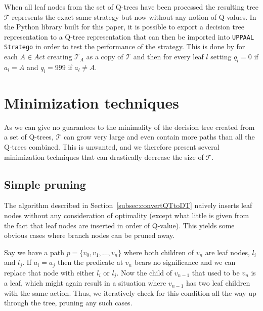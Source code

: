 When all leaf nodes from the set of Q-trees have been processed the resulting
tree $\mathcal{T}$ represents the exact same strategy but now without any notion
of Q-values. In the Python library built for this paper, it is possible to
export a decision tree representation to a Q-tree representation that can then
be imported into \texttt{UPPAAL Stratego} in order to test the performance of
the strategy. This is done by for each $A \in Act$ creating
$\mathcal{T}_A$ as a copy of $\mathcal{T}$ and then for every leaf $l$ setting
$q_l = 0$ if $a_l = A$ and $q_l = 999$ if $a_l \neq A$.



\section{Minimization techniques}%
\label{sec:minimization}

As we can give no guarantees to the minimality of the decision tree created from
a set of Q-trees, $\mathcal{T}$ can grow very large and even contain more paths
than all the Q-trees combined. This is unwanted, and we therefore present
several minimization techniques that can drastically decrease the size of
$\mathcal{T}$.

\subsection{Simple pruning}%
\label{sub:simplePrune}


The algorithm described in Section~\ref{subsec:convertQTtoDT} naively inserts
leaf nodes without any consideration of optimality (except what little is given
from the fact that leaf nodes are inserted in order of Q-value). This yields
some obvious cases where branch nodes can be pruned away.

Say we have a path $p = \{v_0, v_1, \dots, v_n \}$ where both children of $v_n$ 
are leaf nodes, $l_i$ and $l_j$. If $a_i = a_j$ then the predicate at $v_n$
bears no significance and we can replace that node with either $l_i$ or $l_j$.
Now the child of $v_{n-1}$ that used to be $v_n$ is a leaf, which might again
result in a situation where $v_{n-1}$ has two leaf children with the same
action. Thus, we iteratively check for this condition all the way up through the
tree, pruning any such cases.

